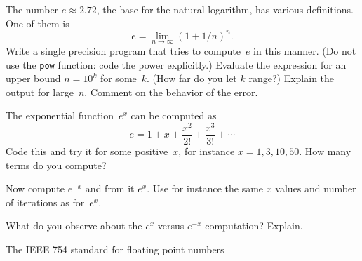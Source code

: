 \begin{exercise}
  \label{ex:e-compute}
  The number $e\approx 2.72$, the base for the natural logarithm, has
  various definitions. One of them is 
  \begin{equation}
    e=\lim_{n\rightarrow\infty} (1+1/n)^n.
  \end{equation}
  Write a single precision program that tries to compute~$e$ in this
  manner. (Do not use the \texttt{pow} function: code the power explicitly.)
  Evaluate the expression for an upper bound $n=10^k$ for some~$k$.
  (How far do you let $k$ range?)
  Explain the output for large~$n$. Comment on the
  behavior of the error.
\end{exercise}

\begin{exercise}
  The exponential function~$e^x$ can be computed as
  \begin{equation}
    e=1+x+\frac{x^2}{2!}+\frac{x^3}{3!}+\cdots
  \end{equation}
  Code this and try it for some positive~$x$,
  for instance $x=1,3,10,50$.
  How many terms do you compute?

  Now compute $e^{-x}$ and from it $e^x$.
  Use for instance the same $x$ values and
  number of iterations as for~$e^x$.

  What do you observe about the $e^x$ versus $e^{-x}$
  computation? Explain.
\end{exercise}


 {The IEEE 754 standard for floating point numbers}
\label{sec:ieee754}

